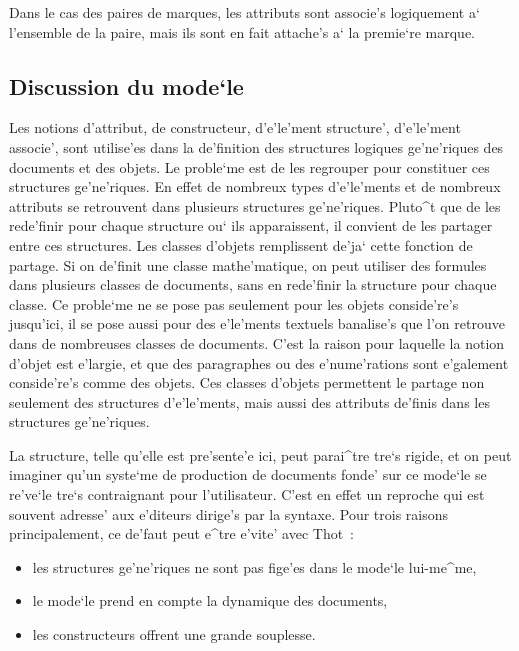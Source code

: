 Dans le cas des paires de marques, les attributs sont associe's logiquement
a` l'ensemble de la paire, mais ils sont en fait attache's a` la premie`re
marque.

\subsection{Discussion du mode`le}

Les notions d'attribut, de constructeur, d'e'le'ment structure', d'e'le'ment
associe', sont utilise'es dans la de'finition des structures logiques
ge'ne'riques des documents et des objets. Le proble`me est de les
regrouper pour constituer ces structures ge'ne'riques. En effet de
nombreux types d'e'le'ments et de nombreux attributs se retrouvent dans
plusieurs structures ge'ne'riques. Pluto^t que de les rede'finir pour
chaque structure ou` ils apparaissent, il convient de les partager entre ces
structures. Les classes d'objets remplissent de'ja` cette fonction de partage.
Si on de'finit une classe mathe'matique, on peut utiliser des formules
dans plusieurs classes de documents, sans en rede'finir la structure
pour chaque classe. Ce proble`me ne se pose pas seulement pour les
objets conside're's jusqu'ici, il se pose aussi pour des e'le'ments textuels
banalise's que l'on retrouve dans de nombreuses classes de documents.
C'est la raison pour laquelle la notion d'objet est e'largie, et que
des paragraphes ou des e'nume'rations sont e'galement conside're's comme des
objets. Ces classes d'objets permettent le partage non seulement des
structures d'e'le'ments, mais aussi des attributs de'finis dans les structures
ge'ne'riques.

La structure, telle qu'elle est pre'sente'e ici, peut parai^tre tre`s rigide,
et on peut imaginer qu'un syste`me de production de documents fonde' sur ce
mode`le se re've`le tre`s contraignant pour l'utilisateur. C'est en effet un
reproche qui est souvent adresse' aux e'diteurs dirige's par la syntaxe.
Pour trois raisons principalement, ce de'faut peut e^tre e'vite' avec Thot~:

\begin{itemize}
\item
les structures ge'ne'riques ne sont pas fige'es dans le mode`le lui-me^me,
\item
le mode`le prend en compte la dynamique des documents,
\item
les constructeurs offrent une grande souplesse.
\end{itemize}

